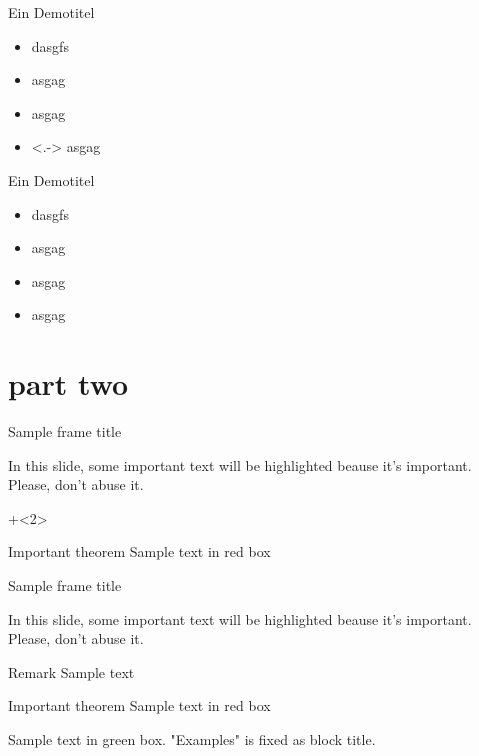 \documentclass[11pt,aspectratio=1610]{beamer}	%
\begin{document}
\begin{frame}[<+->]{Ein Demotitel}{}
	\begin{itemize}
		\item dasgfs
		\item asgag
		\item asgag
		\item<.-> asgag
	\end{itemize}
\end{frame}

\begin{frame}{Ein Demotitel}{}
	\begin{itemize}
		\item<+-> dasgfs
		\item<+-> asgag
		\item<+-> asgag
		\item<+-> asgag
	\end{itemize}
\end{frame}

\section{part two}

\begin{frame}[t]{Sample frame title}{}
	
	In this slide, some important text will be
	\alert<2->{highlighted} beause it's important.
	Please, don't abuse it.
	
	
	
	\onslide+<2>{	%
	\begin{alertblock}{Important theorem}
	Sample text in red box
	\end{alertblock}
	}
	
\end{frame}

\begin{frame}[plain]{Sample frame title}{}
	
	In this slide, some important text will be
	\alert{highlighted} beause it's important.
	Please, don't abuse it.
	
	\begin{block}{Remark}
	Sample text
	\end{block}
	
	\begin{alertblock}{Important theorem}
	Sample text in red box
	\end{alertblock}
	
	\begin{examples}
	Sample text in green box. "Examples" is fixed as block title.
	\end{examples}
\end{frame}
\end{document}
